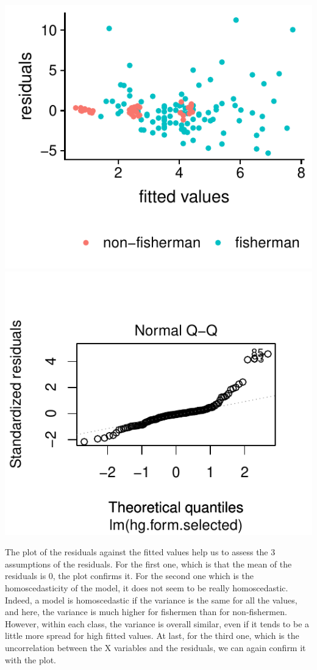 \documentclass[12pt,]{article}
\begin{document}
\includegraphics{Report_files/figure-latex/unnamed-chunk-18-1.pdf}
\includegraphics{Report_files/figure-latex/unnamed-chunk-18-2.pdf}

The plot of the residuals against the fitted values help us to assess
the 3 assumptions of the residuals. For the first one, which is that the
mean of the residuals is 0, the plot confirms it. For the second one
which is the homoscedasticity of the model, it does not seem to be
really homoscedastic. Indeed, a model is homoscedastic if the variance
is the same for all the values, and here, the variance is much higher
for fishermen than for non-fishermen. However, within each class, the
variance is overall similar, even if it tends to be a little more spread
for high fitted values. At last, for the third one, which is the
uncorrelation between the X variables and the residuals, we can again
confirm it with the plot.
\end{document}
